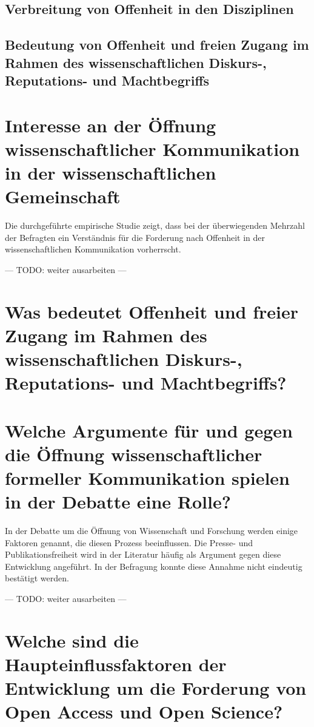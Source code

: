 \subsection{Verbreitung von Offenheit in den Disziplinen}

\subsection{Bedeutung von Offenheit und freien Zugang im Rahmen des wissenschaftlichen Diskurs-, Reputations- und Machtbegriffs}

\section{Interesse an der Öffnung wissenschaftlicher Kommunikation in der wissenschaftlichen Gemeinschaft}

Die durchgeführte empirische Studie zeigt, dass bei der überwiegenden Mehrzahl der Befragten ein Verständnis für die Forderung nach Offenheit in der wissenschaftlichen Kommunikation vorherrscht.

--- TODO: weiter ausarbeiten ---

\section{Was bedeutet Offenheit und freier Zugang im Rahmen des wissenschaftlichen Diskurs-, Reputations- und Machtbegriffs?}

\section{Welche Argumente für und gegen die Öffnung wissenschaftlicher formeller Kommunikation spielen in der Debatte eine Rolle?}

In der Debatte um die Öffnung von Wissenschaft und Forschung werden einige Faktoren genannt, die diesen Prozess beeinflussen. Die Presse- und Publikationsfreiheit wird in der Literatur häufig als Argument gegen diese Entwicklung angeführt. In der Befragung konnte diese Annahme nicht eindeutig bestätigt werden.

--- TODO: weiter ausarbeiten ---

\section{Welche sind die Haupteinflussfaktoren der Entwicklung um die Forderung von Open Access und Open Science?}

